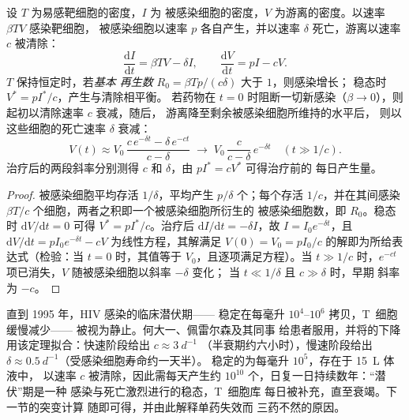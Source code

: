 \begin{theorem}[宿主内的感染动力学]\label{thm:b3:virology:dynamics}
设 $T$ 为易感靶细胞的密度，$I$ 为
被感染细胞的密度，$V$ 为游离的密度。以速率 $\beta TV$ 感染靶细胞，
被感染细胞以速率 $p$ 各自产生，并以速率
$\delta$ 死亡，游离以速率 $c$ 被清除：
\[
\frac{\mathrm{d}I}{\mathrm{d}t} = \beta TV - \delta I, \qquad
\frac{\mathrm{d}V}{\mathrm{d}t} = pI - cV .
\]
$T$ 保持恒定时，若\emph{基本
再生数} $R_{0} = \beta Tp/(c\delta)$ 大于 $1$，则感染增长；
稳态时 $V^{*} = p I^{*}/c$，产生与清除相平衡。
若药物在 $t = 0$ 时阻断一切新感染（$\beta \to 0$），则
起初以清除速率 $c$ 衰减，随后，
游离降至剩余被感染细胞所维持的水平后，
则以这些细胞的死亡速率 $\delta$ 衰减：
\[
V(t) \approx V_{0}\,\frac{c\,e^{-\delta t} - \delta\,e^{-ct}}{c - \delta}
\;\longrightarrow\; V_{0}\,\frac{c}{c-\delta}\,e^{-\delta t}
\quad (t \gg 1/c).
\]
治疗后的两段斜率分别测得 $c$ 和
$\delta$，由 $pI^{*} = cV^{*}$ 可得治疗前的
每日产生量。
\end{theorem}
\begin{proof}
被感染细胞平均存活 $1/\delta$，平均产生 $p/\delta$
个；每个存活 $1/c$，并在其间感染 $\beta T/c$
个细胞，两者之积即一个被感染细胞所衍生的
被感染细胞数，即 $R_{0}$。稳态时 $\mathrm{d}V/\mathrm{d}t = 0$
可得 $V^{*} = pI^{*}/c$。治疗后 $\mathrm{d}I/\mathrm{d}t =
-\delta I$，故 $I = I_{0}e^{-\delta t}$，且 $\mathrm{d}V/\mathrm{d}t =
pI_{0}e^{-\delta t} - cV$ 为线性方程，其解满足
$V(0) = V_{0} = pI_{0}/c$ 的解即为所给表达式（检验：当 $t = 0$ 时，其值等于
$V_{0}$，且逐项满足方程）。当 $t
\gg 1/c$ 时，$e^{-ct}$ 项已消失，$V$ 随被感染细胞以斜率 $-\delta$ 变化；
当 $t \ll 1/\delta$ 且 $c \gg \delta$ 时，早期
斜率为 $-c$。
\end{proof}

\begin{example}\label{ex:b3:virology:hiv}
直到 1995 年，HIV 感染的临床潜伏期——
稳定在每毫升 $10^{4}$--$10^{6}$ 拷贝，T~细胞缓慢减少——
被视为静止。何大一、佩雷尔森及其同事
给患者服用，并将的下降
用该定理拟合：快速阶段给出 $c \approx \qty{3}{d^{-1}}$
（半衰期约六小时），慢速阶段给出 $\delta \approx
\qty{0.5}{d^{-1}}$（受感染细胞寿命约一天半）。
稳定的为每毫升 $10^{5}$，存在于 \qty{15}{L} 体液中，
以速率 $c$ 被清除，因此需每天产生约 $10^{10}$
个，日复一日持续数年：“潜伏”期是一种
感染与死亡激烈进行的稳态，T~细胞库
每日被补充，直至衰竭。下一节的突变计算
随即可得，并由此解释单药失效而
三药不然的原因。
\end{example}

